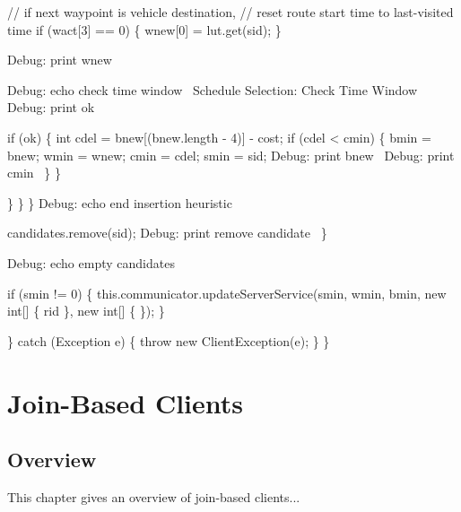             // if next waypoint is vehicle destination,
            // reset route start time to last-visited time
            if (wact[3] == 0) \{
              wnew[0] = lut.get(sid);
            \}

            \LA{}Debug: print wnew~{\nwtagstyle{}}\RA{}

            \LA{}Debug: echo check time window~{\nwtagstyle{}}\RA{}
            \LA{}Schedule Selection: Check Time Window~{\nwtagstyle{}}\RA{}
            \LA{}Debug: print ok~{\nwtagstyle{}}\RA{}

            if (ok) \{
              int cdel = bnew[(bnew.length - 4)] - cost;
              if (cdel < cmin) \{
                bmin = bnew;
                wmin = wnew;
                cmin = cdel;
                smin = sid;
                \LA{}Debug: print bnew~{\nwtagstyle{}}\RA{}
                \LA{}Debug: print cmin~{\nwtagstyle{}}\RA{}
              \}
            \}

          \}
        \}
      \}
      \LA{}Debug: echo end insertion heuristic~{\nwtagstyle{}}\RA{}

      candidates.remove(sid);
      \LA{}Debug: print remove candidate~{\nwtagstyle{}}\RA{}
    \}

    \LA{}Debug: echo empty candidates~{\nwtagstyle{}}\RA{}

    if (smin != 0) \{
      this.communicator.updateServerService(smin, wmin, bmin,
          new int[] \{ rid \}, new int[] \{ \});
    \}

  \} catch (Exception e) \{
    throw new ClientException(e);
  \}
\}
\nwendcode{}\nwdocspar

\nwenddocs{}\part{Join-Based Clients}
\label{part-join}

\chapter{Overview}
\label{join-overview}

This chapter gives an overview of join-based clients...

